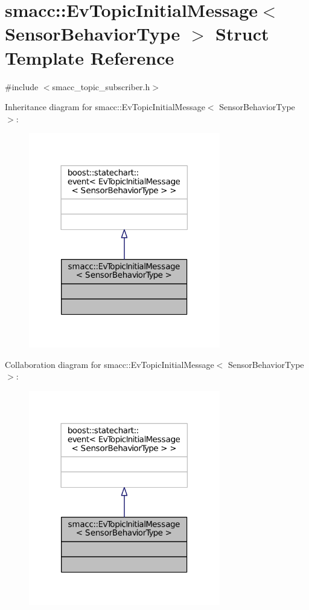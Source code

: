 \hypertarget{structsmacc_1_1EvTopicInitialMessage}{}\section{smacc\+:\+:Ev\+Topic\+Initial\+Message$<$ Sensor\+Behavior\+Type $>$ Struct Template Reference}
\label{structsmacc_1_1EvTopicInitialMessage}


{\ttfamily \#include $<$smacc\+\_\+topic\+\_\+subscriber.\+h$>$}



Inheritance diagram for smacc\+:\+:Ev\+Topic\+Initial\+Message$<$ Sensor\+Behavior\+Type $>$\+:
\nopagebreak
\begin{figure}[H]
\begin{center}
\leavevmode
\includegraphics[width=237pt]{structsmacc_1_1EvTopicInitialMessage__inherit__graph}
\end{center}
\end{figure}


Collaboration diagram for smacc\+:\+:Ev\+Topic\+Initial\+Message$<$ Sensor\+Behavior\+Type $>$\+:
\nopagebreak
\begin{figure}[H]
\begin{center}
\leavevmode
\includegraphics[width=237pt]{structsmacc_1_1EvTopicInitialMessage__coll__graph}
\end{center}
\end{figure}



